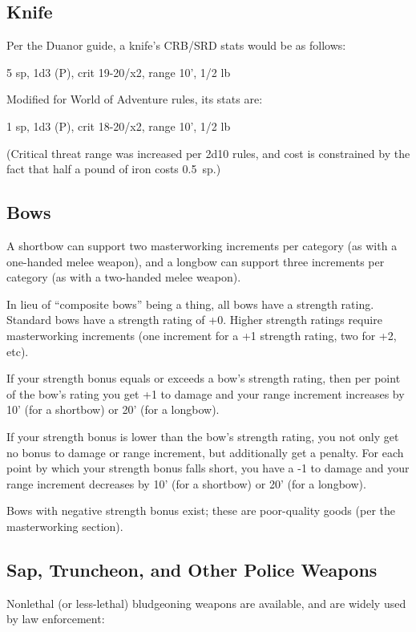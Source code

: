 %
\subsection{Knife}

Per the Duanor guide, a knife's CRB/SRD stats would be as follows:

5 sp, 1d3 (P), crit 19-20/x2, range 10', 1/2 lb

Modified for World of Adventure rules, its stats are:

1 sp, 1d3 (P), crit 18-20/x2, range 10', 1/2 lb

(Critical threat range was increased per 2d10 rules, and cost is constrained
by the fact that half a pound of iron costs 0.5~sp.)
%

%
\subsection{Bows}

A shortbow can support two masterworking increments per category (as with
a one-handed melee weapon), and a longbow can support three increments per
category (as with a two-handed melee weapon).

In lieu of ``composite bows'' being a thing, all bows have a strength
rating. Standard bows have a strength rating of +0. Higher strength ratings
require masterworking increments (one increment for a +1 strength rating,
two for +2, etc).

If your strength bonus equals or exceeds a bow's strength rating, then per
point of the bow's rating you get +1 to damage and your range increment
increases by 10' (for a shortbow) or 20' (for a longbow).

If your strength bonus is lower than the bow's strength rating, you not only
get no bonus to damage or range increment, but additionally get a penalty.
For each point by which your strength bonus falls short, you have a -1 to
damage and your range increment decreases by 10' (for a shortbow) or 20'
(for a longbow).

Bows with negative strength bonus exist; these are poor-quality goods
(per the masterworking section).
%

%
\subsection{Sap, Truncheon, and Other Police Weapons}

Nonlethal (or less-lethal) bludgeoning weapons are available, and are
widely used by law enforcement:

